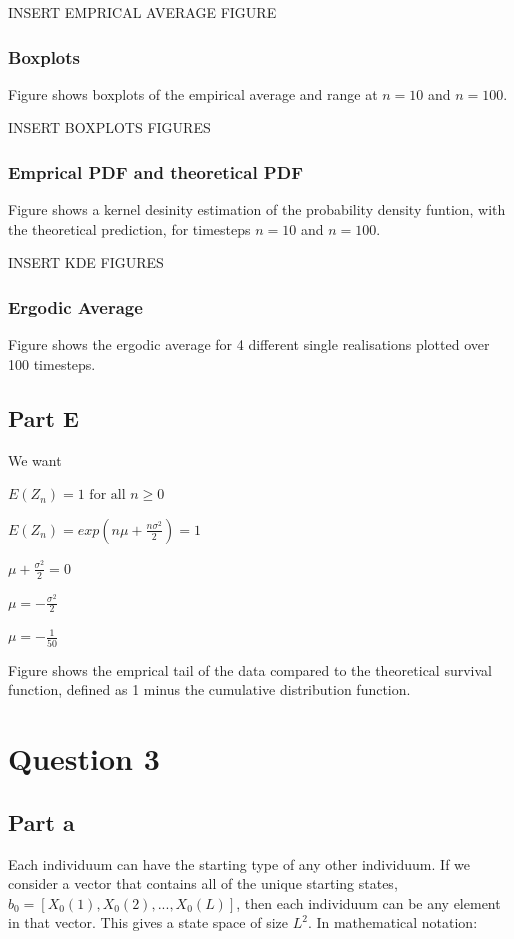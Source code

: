 \documentclass{article}
\begin{document}
INSERT EMPRICAL AVERAGE FIGURE

\subsubsection{Boxplots}
Figure shows boxplots of the empirical average and range at $n=10$ and $n=100$. 

INSERT BOXPLOTS FIGURES

\subsubsection{Emprical PDF and theoretical PDF}
Figure shows a kernel desinity estimation of the probability density funtion, with the theoretical prediction, for timesteps $n=10$ and $n=100$. 

INSERT KDE FIGURES

\subsubsection{Ergodic Average}
Figure shows the ergodic average for 4 different single realisations plotted over 100 timesteps. 

\subsection{Part E}

We want 

$E(Z_n) = 1 \text{ for all } n\geq0$

$E(Z_n) = exp(n\mu + \frac{n\sigma^2}{2}) = 1$

$\mu + \frac{\sigma^2}{2} = 0$

$\mu = - \frac{\sigma^2}{2}$

$\mu = -\frac{1}{50}$

Figure shows the emprical tail of the data compared to the theoretical survival function, defined as 1 minus the cumulative distribution function.




\section{Question 3}

\subsection{Part a}


Each individuum can have the starting type of any other individuum. If we consider a vector that contains all of the unique starting states, $b_0 = [X_0(1), X_0(2), . . . , X_0(L)]$, then each individuum can be any element in that vector. This gives a state space of size $L^2$. In mathematical notation:
\end{document}
